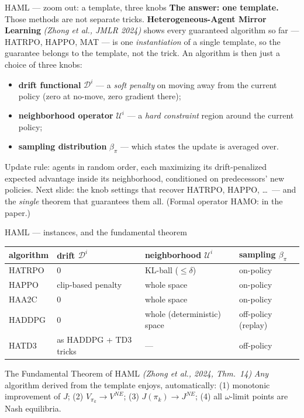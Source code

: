 \documentclass[10pt, aspectratio=169]{beamer}
\newcommand{\paper}[1]{\textcolor{mLightBrown}{\small\textit{(#1)}}}
\begin{document}
\begin{frame}{HAML --- zoom out: a template, three knobs}
\textbf{The answer: one template.} Those methods are not separate tricks. \textbf{Heterogeneous-Agent Mirror Learning} \paper{Zhong et al., JMLR 2024} shows every guaranteed algorithm so far --- HATRPO, HAPPO, MAT --- is one \emph{instantiation} of a single template, so the \alert{guarantee belongs to the template, not the trick}. An algorithm is then just a choice of \alert{three knobs}:
\medskip
\begin{itemize}\setlength\itemsep{3pt}
\item \textbf{drift functional} $\mathcal{D}^i$ --- a \emph{soft penalty} on moving away from the current policy (zero at no-move, zero gradient there);
\item \textbf{neighborhood operator} $\mathcal{U}^i$ --- a \emph{hard constraint} region around the current policy;
\item \textbf{sampling distribution} $\beta_{\pi}$ --- which states the update is averaged over.
\end{itemize}
\medskip
Update rule: agents in random order, each maximizing its drift-penalized expected advantage inside its neighborhood, conditioned on predecessors' new policies.
\medskip
\pause
{\footnotesize\textcolor{mLightBrown}{Next slide: the knob settings that recover HATRPO, HAPPO, \dots\ --- and the \emph{single} theorem that guarantees them all. (Formal operator HAMO: in the paper.)}}
\end{frame}

\begin{frame}{HAML --- instances, and the fundamental theorem}
\begin{center}\footnotesize\renewcommand{\arraystretch}{1.45}
\begin{tabular}{l|l|l|l}
\textbf{algorithm} & \textbf{drift} $\mathcal{D}^i$ & \textbf{neighborhood} $\mathcal{U}^i$ & \textbf{sampling} $\beta_\pi$ \\
\hline
HATRPO & $0$ & KL-ball ($\le\delta$) & on-policy \\
HAPPO & clip-based penalty & whole space & on-policy \\
HAA2C & $0$ & whole space & on-policy \\
HADDPG & $0$ & whole (deterministic) space & \alert{off-policy} (replay) \\
HATD3 & as HADDPG + TD3 tricks & --- & off-policy \\
\end{tabular}
\end{center}
\smallskip
\begin{block}{The Fundamental Theorem of HAML \hfill {\scriptsize\normalfont\paper{Zhong et al., 2024, Thm.\ 14}}}
\emph{Any} algorithm derived from the template enjoys, automatically:
(1) monotonic improvement of $J$; \; (2) $V_{\pi_k} \to V^{NE}$; \; (3) $J(\pi_k) \to J^{NE}$; \; (4) all $\omega$-limit points are Nash equilibria.
\end{block}
\end{frame}
\end{document}
